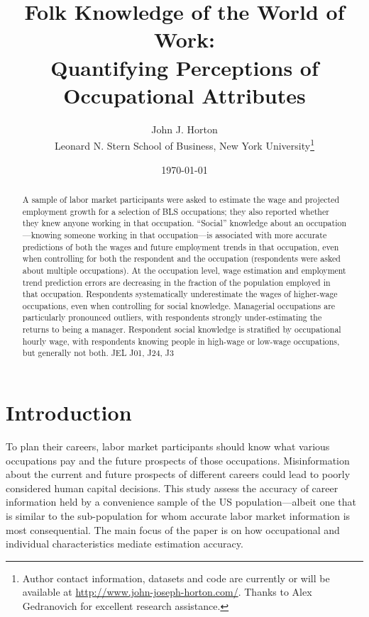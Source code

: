 \documentclass[11pt]{article}
\begin{document}
 

\title{Folk Knowledge of the World of Work: \\ Quantifying Perceptions of Occupational Attributes}

\date{\today}

\author{John J. Horton \\ Leonard N. Stern School of Business, New
  York University\footnote{Author contact information, datasets and
    code are currently or will be available at
    \href{http://www.john-joseph-horton.com/}{http://www.john-joseph-horton.com/}. 
    Thanks to Alex Gedranovich for excellent research assistance. 
} }
\maketitle

\begin{abstract}
\noindent  
A sample of labor market participants were asked to estimate the wage and projected employment growth for a selection of BLS occupations; they also reported whether they knew anyone working in that occupation. 
``Social'' knowledge about an occupation---knowing someone working in that occupation---is associated with more accurate predictions of both the wages and future employment trends in that occupation, even when controlling for both the respondent and the occupation (respondents were asked about multiple occupations).  
At the occupation level, wage estimation and employment trend prediction errors are decreasing in the fraction of the population employed in that occupation.  
Respondents systematically underestimate the wages of higher-wage occupations, even when controlling for social knowledge. 
Managerial occupations are particularly pronounced outliers, with respondents strongly under-estimating the returns to being a manager.   
Respondent social knowledge is stratified by occupational hourly wage, with respondents knowing people in high-wage or low-wage occupations, but generally not both.  
\newline 
\newline 
\noindent JEL J01, J24, J3
\end{abstract} 

\section{Introduction}
To plan their careers, labor market participants should know what various occupations pay and the future prospects of those occupations. 
Misinformation about the current and future prospects of different careers could lead to poorly considered human capital decisions. 
This study assess the accuracy of career information held by a convenience sample of the US population---albeit one that is similar to the sub-population for whom accurate labor market information is most consequential. 
The main focus of the paper is on how occupational and individual characteristics mediate estimation accuracy. 
\end{document}
